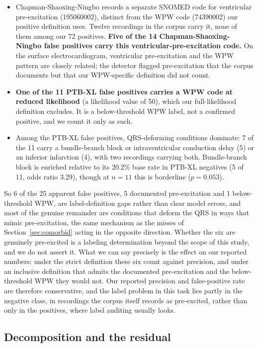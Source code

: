 \documentclass[11pt]{article}
\begin{document}
\begin{itemize}[leftmargin=1.4em,itemsep=1pt]
  \item Chapman-Shaoxing-Ningbo records a separate SNOMED code for ventricular pre-excitation (195060002), distinct from the WPW code (74390002) our positive definition uses. Twelve recordings in the corpus carry it, none of them among our 72 positives. \textbf{Five of the 14 Chapman-Shaoxing-Ningbo false positives carry this ventricular-pre-excitation code.} On the surface electrocardiogram, ventricular pre-excitation and the WPW pattern are closely related; the detector flagged pre-excitation that the corpus documents but that our WPW-specific definition did not count.
  \item \textbf{One of the 11 PTB-XL false positives carries a WPW code at reduced likelihood} (a likelihood value of 50), which our full-likelihood definition excludes. It is a below-threshold WPW label, not a confirmed positive, and we count it only as such.
  \item Among the PTB-XL false positives, QRS-deforming conditions dominate: 7 of the 11 carry a bundle-branch block or intraventricular conduction delay (5) or an inferior infarction (4), with two recordings carrying both. Bundle-branch block is enriched relative to its 20.2\% base rate in PTB-XL negatives (5 of 11, odds ratio 3.29), though at $n = 11$ this is borderline ($p = 0.053$).
\end{itemize}

So 6 of the 25 apparent false positives, 5 documented pre-excitation and 1 below-threshold WPW, are label-definition gaps rather than clear model errors, and most of the genuine remainder are conditions that deform the QRS in ways that mimic pre-excitation, the same mechanism as the misses of Section~\ref{sec:comorbid} acting in the opposite direction. Whether the six are genuinely pre-excited is a labeling determination beyond the scope of this study, and we do not assert it. What we can say precisely is the effect on our reported numbers: under the strict definition these six count against precision, and under an inclusive definition that admits the documented pre-excitation and the below-threshold WPW they would not. Our reported precision and false-positive rate are therefore conservative, and the label problem in this task lies partly in the negative class, in recordings the corpus itself records as pre-excited, rather than only in the positives, where label auditing usually looks.

\subsection{Decomposition and the residual}
\end{document}
